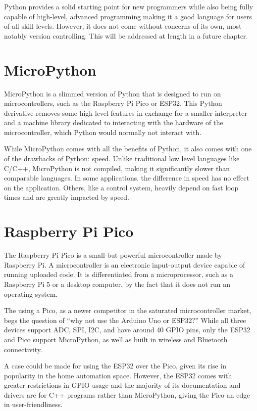 Python provides a solid starting point for new programmers while also being fully capable of high-level,
advanced programming making it a good language for users of all skill levels. However, it does not come 
without concerns of its own, most notably version controlling. This will be addressed at
length in a future chapter.

\section{MicroPython}

MicroPython is a slimmed version of Python that is designed to run on microcontrollers, such as the
Raspberry Pi Pico or ESP32. This Python derivative removes some high level features in exchange for
a smaller interpreter and a machine library dedicated to interacting with the hardware of the 
microcontroller, which Python would normally not interact with.

While MicroPython comes with all the benefits of Python, it also comes with one of the drawbacks
of Python: speed. Unlike traditional low level languages like C/C++, MicroPython is not compiled,
making it significantly slower than comparable languages. In some applications, the difference in
speed has no effect on the application. Others, like a control system, heavily depend on fast loop
times and are greatly impacted by speed.

\section{Raspberry Pi Pico}

The Raspberry Pi Pico is a small-but-powerful microcontroller made by Raspberry Pi. A microcontroller
is an electronic input-output device capable of running uploaded code. It is differentiated
from a microprocessor, such as a Raspberry Pi 5 or a desktop computer, by the fact that it does not run 
an operating system. 

The using a Pico, as a newer competitor in the saturated microcontroller market, begs the question of 
``why not use the Arduino Uno or ESP32?'' While all three devices support ADC, SPI, I2C, and have 
around 40 GPIO pins, only the ESP32 and Pico support MicroPython, as well as built in wireless and 
Bluetooth connectivity.

A case could be made for using the ESP32 over the Pico, given its rise in popularity in the home
automation space. However, the ESP32 comes with greater restrictions in GPIO usage and the majority
of its documentation and drivers are for C++ programs rather than MicroPython, giving the Pico an
edge in user-friendliness.

